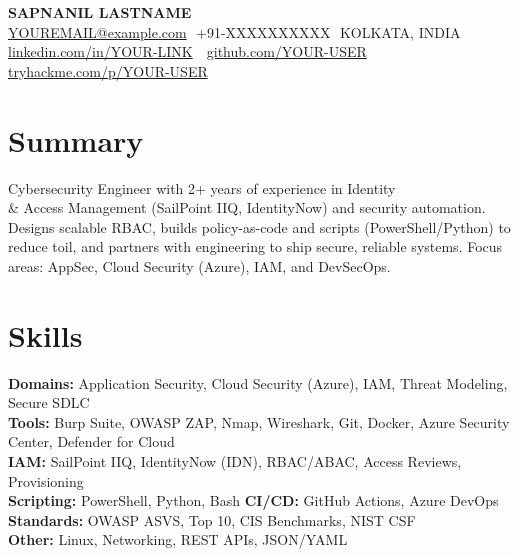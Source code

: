 \documentclass[11pt]{article}
\newcommand{\sep}{\,\textbar\,}
\begin{document}
\begin{center}
    {\LARGE \textbf{SAPNANIL LASTNAME}}\\[4pt]
    \href{mailto:YOUREMAIL@example.com}{YOUREMAIL@example.com} \sep +91-XXXXXXXXXX \sep KOLKATA, INDIA \\[-1pt]
    \href{https://www.linkedin.com/in/YOUR-LINK}{linkedin.com/in/YOUR-LINK} \sep
    \href{https://github.com/YOUR-USER}{github.com/YOUR-USER} \sep
    \href{https://tryhackme.com/p/YOUR-USER}{tryhackme.com/p/YOUR-USER}
\end{center}

\section*{Summary}
Cybersecurity Engineer with 2+ years of experience in Identity \\
\& Access Management (SailPoint IIQ, IdentityNow) and security automation.\\
Designs scalable RBAC, builds policy-as-code and scripts (PowerShell/Python) to reduce toil, and partners with engineering to ship secure, reliable systems. Focus areas: AppSec, Cloud Security (Azure), IAM, and DevSecOps.

\section*{Skills}
\textbf{Domains:} Application Security, Cloud Security (Azure), IAM, Threat Modeling, Secure SDLC\\
\textbf{Tools:} Burp Suite, OWASP ZAP, Nmap, Wireshark, Git, Docker, Azure Security Center, Defender for Cloud\\
\textbf{IAM:} SailPoint IIQ, IdentityNow (IDN), RBAC/ABAC, Access Reviews, Provisioning\\
\textbf{Scripting:} PowerShell, Python, Bash \quad \textbf{CI/CD:} GitHub Actions, Azure DevOps\\
\textbf{Standards:} OWASP ASVS, Top 10, CIS Benchmarks, NIST CSF\\
\textbf{Other:} Linux, Networking, REST APIs, JSON/YAML

\end{document}
